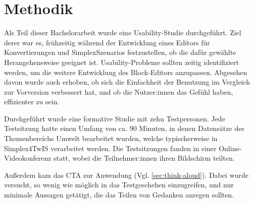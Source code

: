 \section{Methodik}
\label{sec:study-methods}

Als Teil dieser Bachelorarbeit wurde eine Usability-Studie durchgeführt. Ziel derer war es, frühzeitig während der Entwicklung eines Editors für Konvertierungen und SimplexSzenarios festzustellen, ob die dafür gewählte Herangehensweise geeignet ist. Usability-Probleme sollten zeitig identifiziert werden, um die weitere Entwicklung des Block-Editors anzupassen. Abgesehen davon wurde auch erhoben, ob sich die Einfachheit der Benutzung im Vergleich zur Vorversion verbessert hat, und ob die Nutzer:innen das Gefühl haben, effizienter zu sein.

Durchgeführt wurde eine formative Studie mit zehn Testpersonen. Jede Testsitzung hatte einen Umfang von ca. 90 Minuten, in denen Datensätze des Themenbereichs Umwelt bearbeitet wurden, welche typischerweise in Simplex4TwIS verarbeitet werden. Die Testsitzungen fanden in einer Online-Videokonferenz statt, wobei die Teilnehmer:innen ihren Bildschirm teilten.

Außerdem kam das \acf{CTA} zur Anwendung (Vgl. \ref{sec:think-aloud}). Dabei wurde versucht, so wenig wie möglich in das Testgeschehen einzugreifen, und nur minimale Aussagen getätigt, die das Teilen von Gedanken anregen sollten.
